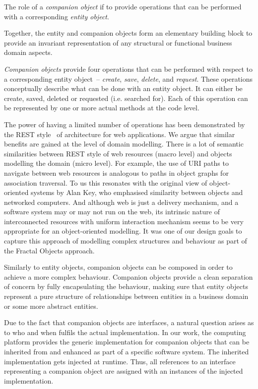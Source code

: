 \documentclass[a4paper,12pt,oneside,openright,final]{memoir} %
\begin{document}
		
	
  	The role of a \emph{companion object} if to provide operations that can be performed with a corresponding \emph{entity object}.

  	Together, the entity and companion objects form an elementary building block to provide an invariant representation of any structural or functional business domain aspects.

  
  \emph{Companion objects} provide four operations that can be performed with respect to a corresponding entity object~--  \emph{create}, \emph{save}, \emph{delete}, and \emph{request}.
  These operations conceptually describe what can be done with an entity object.
  It can either be create, saved, deleted or requested (i.e. searched for).
  Each of this operation can be represented by one or more actual methods at the code level.
    
  The power of having a limited number of operations has been demonstrated by the REST style~\cite{Fielding2000} of architecture for web applications.
  We argue that similar benefits are gained at the level of domain modelling.
  There is a lot of semantic similarities between REST style of web resources (macro level) and objects modelling the domain (micro level).
  For example, the use of URI paths to navigate between web resources is analogous to paths in object graphs for association traversal.
  To us this resonates with the original view of object-oriented systems by Alan Key, who emphasised similarity between objects and networked computers.
  And although web is just a delivery mechanism, and a software system may or may not run on the web, its intrinsic nature of interconnected resources with uniform interaction mechanism seems to be very appropriate for an object-oriented modelling.
  It was one of our design goals to capture this approach of modelling complex structures and behaviour as part of the Fractal Objects approach.

  Similarly to entity objects, companion objects can be composed in order to achieve a more complex behaviour.
  Companion objects provide a clean separation of concern by fully encapsulating the behaviour, making sure that entity objects represent a pure structure of relationships between entities in a business domain or some more abstract entities.
  
  Due to the fact that companion objects are interfaces, a natural question arises as to who and when fulfils the actual implementation.
  In our work, the computing platform provides the generic implementation for companion objects that can be inherited from and enhanced as part of a specific software system.
  The inherited implementation gets injected at runtime.
  Thus, all references to an interface representing a companion object are assigned with an instances of the injected implementation.
\end{document}
